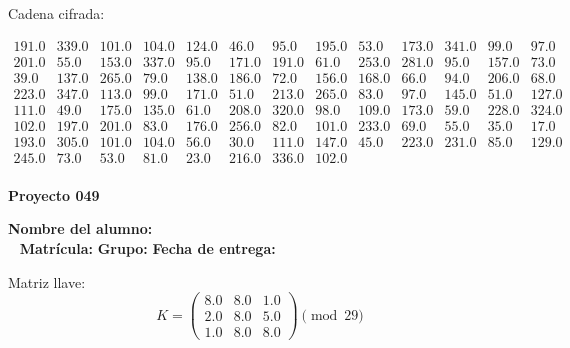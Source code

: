 \documentclass[12pt]{article}
\begin{document}
Cadena cifrada:
\begin{center}
$\begin{array}{lllllllllllll}
191.0 & 339.0 & 101.0 & 104.0 & 124.0 & 46.0 & 95.0 & 195.0 & 53.0 & 173.0 & 341.0 & 99.0 & 97.0\\
201.0 & 55.0 & 153.0 & 337.0 & 95.0 & 171.0 & 191.0 & 61.0 & 253.0 & 281.0 & 95.0 & 157.0 & 73.0\\
39.0 & 137.0 & 265.0 & 79.0 & 138.0 & 186.0 & 72.0 & 156.0 & 168.0 & 66.0 & 94.0 & 206.0 & 68.0\\
223.0 & 347.0 & 113.0 & 99.0 & 171.0 & 51.0 & 213.0 & 265.0 & 83.0 & 97.0 & 145.0 & 51.0 & 127.0\\
111.0 & 49.0 & 175.0 & 135.0 & 61.0 & 208.0 & 320.0 & 98.0 & 109.0 & 173.0 & 59.0 & 228.0 & 324.0\\
102.0 & 197.0 & 201.0 & 83.0 & 176.0 & 256.0 & 82.0 & 101.0 & 233.0 & 69.0 & 55.0 & 35.0 & 17.0\\
193.0 & 305.0 & 101.0 & 104.0 & 56.0 & 30.0 & 111.0 & 147.0 & 45.0 & 223.0 & 231.0 & 85.0 & 129.0\\
245.0 & 73.0 & 53.0 & 81.0 & 23.0 & 216.0 & 336.0 & 102.0\\
\end{array}$
\end{center}

\newpage


\textbf{Proyecto 049}

\textbf{Nombre del alumno:} \underline{\hspace{13cm}}\\\
\vspace{1cm}
\textbf{Matrícula:} \underline{\hspace{4cm}} \hspace{1cm}
\textbf{Grupo:} \underline{\hspace{2cm}}
\textbf{Fecha de entrega:} \underline{\hspace{2cm}}

\medskip

Matriz llave:
\[
K = \begin{pmatrix}
8.0 & 8.0 & 1.0\\
2.0 & 8.0 & 5.0\\
1.0 & 8.0 & 8.0
\end{pmatrix} \pmod{29}
\]
\end{document}
